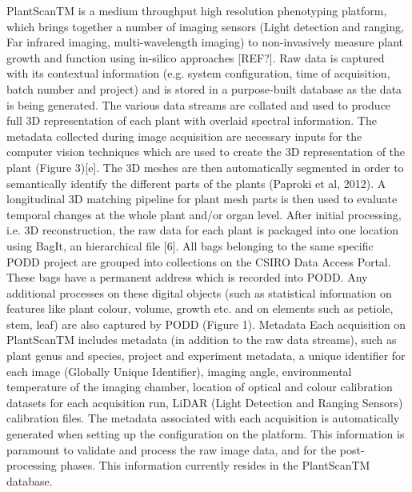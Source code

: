 \documentclass{llncs}
\begin{document}
PlantScanTM is a medium throughput high resolution phenotyping platform, which
brings together a number of imaging sensors (Light detection and ranging, Far
infrared imaging, multi-wavelength imaging) to non-invasively measure plant
growth and function using in-silico approaches [REF?]. Raw data is captured with
its contextual information (e.g. system configuration, time of acquisition,
batch number and project) and is stored in a purpose-built database as the data
is being generated. The various data streams are collated and used to produce
full 3D representation of each plant with overlaid spectral information. The
metadata collected during image acquisition are necessary inputs for the
computer vision techniques which are used to create the 3D representation of the
plant (Figure 3)[e]. The 3D meshes are then automatically segmented in order to
semantically identify the different parts of the plants (Paproki et al, 2012). A
longitudinal 3D matching pipeline for plant mesh parts is then used to evaluate 
temporal changes at the whole plant and/or organ level. After initial
processing, i.e. 3D reconstruction, the raw data for each plant is packaged into
one location using BagIt, an hierarchical file [6]. All bags belonging to the
same specific PODD project are grouped into collections on the CSIRO Data Access
Portal. These bags have a permanent address which is recorded into PODD. Any
additional processes on these digital objects (such as statistical information
on features like plant colour, volume,  growth etc. and on elements such as
petiole, stem, leaf) are also captured by PODD (Figure 1). Metadata
Each acquisition on PlantScanTM includes metadata (in addition to the raw data
streams), such as plant genus and species, project and experiment metadata, a
unique identifier for each image (Globally Unique Identifier), imaging angle,
environmental temperature of the imaging chamber, location of optical and colour
calibration datasets for each acquisition run, LiDAR (Light Detection and
Ranging Sensors) calibration files. The metadata associated with each
acquisition is automatically generated when setting up the configuration on the
platform. This information is paramount to validate and process the raw image
data, and for the post-processing phases. This information currently resides in
the PlantScanTM database.
\end{document}
